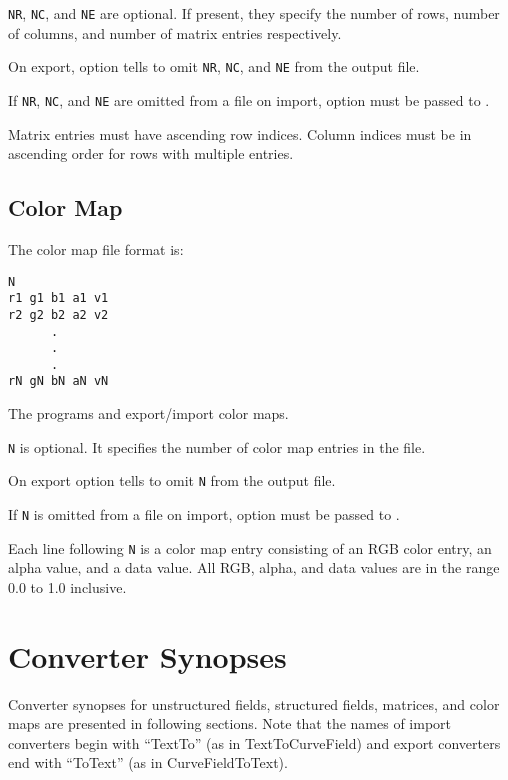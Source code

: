 \verb|NR|, \verb|NC|, and \verb|NE| are optional.  If present, they
specify the number of rows, number of columns, and number of matrix
entries respectively.

On export, option  tells
 to omit \verb|NR|, \verb|NC|, and
\verb|NE| from the output file.

If \verb|NR|, \verb|NC|, and \verb|NE| are omitted from a file on
import, option  must be passed to .

Matrix entries must have ascending row indices. Column indices must be
in ascending order for rows with multiple entries.

\subsection{Color Map}
\label{sec:colormap_fmt}

The color map file format is:

\begin{verbatim}
N
r1 g1 b1 a1 v1
r2 g2 b2 a2 v2
      .
      .
      .
rN gN bN aN vN
\end{verbatim}

The programs  and 
export/import color maps.

\verb|N| is optional.  It specifies the number of color map entries in
the file.

On export option  tells  to
omit \verb|N| from the output file.

If \verb|N| is omitted from a file on import, option
 must be passed to .

Each line following \verb|N| is a color map entry consisting of an RGB
color entry, an alpha value, and a data value.  All RGB, alpha, and
data values are in the range 0.0 to 1.0 inclusive.

\section{Converter Synopses}
\label{sec:converter_synopses}

Converter synopses for unstructured fields, structured fields, matrices,
and color maps are presented in following sections.   Note that
the names of import converters begin with ``TextTo'' (as in
TextToCurveField) and export converters end with ``ToText'' (as in
CurveFieldToText).

